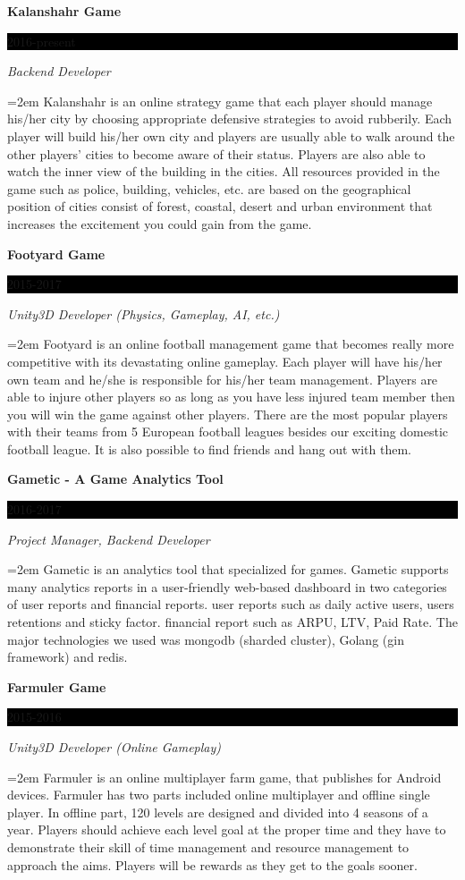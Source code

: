 \documentclass[paper=a4,fontsize=11pt]{scrartcl} %
\newcommand{\sepspace}{\vspace*{1em}}		%
\newcommand{\EducationEntry}[4]{
		\noindent \textbf{#1} \hfill      %
		\colorbox{Black}{%
			\parbox{6em}{%
			\hfill\color{White}#2}} \par  %
		\noindent \textit{#3} \par        %
		\noindent\hangindent=2em\hangafter=0 \small #4 %
		\normalsize \par}
\newcommand{\ExperienceEntry}[4]{ 		%
		\noindent \textbf{#1} \hfill      %
		\colorbox{Black}{%
			\parbox{6em}{%
			\hfill\color{White}#2}} \par  	%
		\noindent \textit{#3} \par        %
		\noindent\hangindent=2em\hangafter=0 \small #4 %
		\normalsize \par}
\begin{document}
\ExperienceEntry{Kalanshahr Game}{2016-present}{Backend Developer}{Kalanshahr is an online strategy game that each player should manage his/her city by choosing appropriate defensive strategies to avoid rubberily. Each player will build his/her own city and players are usually able to walk around the other players' cities to become aware of their status. Players are also able to watch the inner view of the building in the cities. All resources provided in the game such as police, building, vehicles, etc. are based on the geographical position of cities consist of forest, coastal, desert and urban environment that increases the excitement you could gain from the game.}
\sepspace

\clearpage

\ExperienceEntry{Footyard Game}{2015-2017}{Unity3D Developer (Physics, Gameplay, AI, etc.)}{Footyard is an online football management game that becomes really more competitive with its devastating online gameplay. Each player will have his/her own team and he/she is responsible for his/her team management. Players are able to injure other players so as long as you have less injured team member then you will win the game against other players. There are the most popular players with their teams from 5 European football leagues besides our exciting domestic football league. It is also possible to find friends and hang out with them.}
\sepspace

\ExperienceEntry{Gametic - A Game Analytics Tool}{2016-2017}{Project Manager, Backend Developer}{Gametic is an analytics tool that specialized for games. Gametic supports many analytics reports in a user-friendly web-based dashboard in two categories of user reports and financial reports. user reports such as daily active users, users retentions and sticky factor. financial report such as ARPU, LTV, Paid Rate.
The major technologies we used was mongodb (sharded cluster), Golang (gin framework) and redis.}
\sepspace

\ExperienceEntry{Farmuler Game}{2015-2016}{Unity3D Developer (Online Gameplay)}{Farmuler is an online multiplayer farm game, that publishes for Android devices. Farmuler has two parts included online multiplayer and offline single player. In offline part, 120 levels are designed and divided into 4 seasons of a year. Players should achieve each level goal at the proper time and they have to demonstrate their skill of time management and resource management to approach the aims. Players will be rewards as they get to the goals sooner.}
\sepspace
\end{document}
